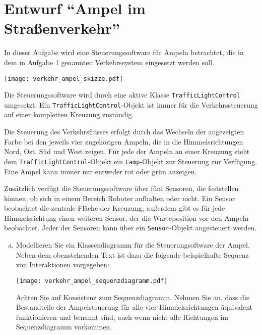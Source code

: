
\section{Entwurf \enquote{Ampel im Straßenverkehr} }

In dieser Aufgabe wird eine Steuerungssoftware für Ampeln betrachtet, die in dem in Aufgabe 1 genannten Verkehrssystem eingesetzt werden soll.

\begin{center}
	\texttt{[image: verkehr\_ampel\_skizze.pdf]}
\end{center}

Die Steuerungssoftware wird durch eine aktive Klasse \texttt{TrafficLightControl} umgesetzt.
Ein \texttt{TrafficLightControl}-Objekt ist immer für die Verkehrssteuerung auf einer kompletten Kreuzung zuständig.

Die Steuerung des Verkehrsflusses erfolgt durch das Wechseln der angezeigten Farbe bei den jeweils vier zugehörigen Ampeln, die in die Himmelsrichtungen Nord, Ost, Süd und West zeigen.
Für jede der Ampeln an einer Kreuzung steht dem \texttt{TrafficLightControl}-Objekt ein \texttt{Lamp}-Objekt zur Steuerung zur Verfügung.
Eine Ampel kann immer nur entweder rot oder grün anzeigen. 

Zusätzlich verfügt die Steuerungssoftware über fünf Sensoren, die feststellen können, ob sich in einem Bereich Roboter aufhalten oder nicht. Ein Sensor beobachtet die zentrale Fläche der Kreuzung, außerdem gibt es für jede Himmelsrichtung einen weiteren Sensor, der die Warteposition vor den Ampeln beobachtet. Jeder der Sensoren kann über ein \texttt{Sensor}-Objekt angesteuert werden.



\begin{enumerate}[a) ]
	\item Modellieren Sie ein Klassendiagramm für die Steuerungsoftware der Ampel.	Neben dem obenstehenden Text ist dazu die folgende beispielhafte Sequenz von Interaktionen vorgegeben:

	\begin{center}
		\texttt{[image: verkehr\_ampel\_sequenzdiagramm.pdf]}
	\end{center}

	Achten Sie auf Konsistenz zum Sequenzdiagramm. 
	Nehmen Sie an, dass die Bestandteile der Ampelsteuerung für alle vier Himmelsrichtungen äquivalent funktionieren und benannt sind, auch wenn nicht alle Richtungen im Sequenzdiagramm vorkommen. 
\end{enumerate}



